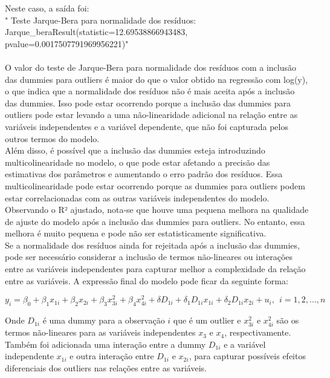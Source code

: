 \documentclass[a4paper, 12pt]{article}
\begin{document}
Neste caso, a saída foi:\\

" Teste Jarque-Bera para normalidade dos resíduos:\\ Jarque\_beraResult(statistic=12.69538866943483, pvalue=0.0017507791969956221)" \\ \\

O valor do teste de Jarque-Bera para normalidade dos resíduos com a inclusão das dummies para outliers é maior do que o valor obtido na regressão com log(y), o que indica que a normalidade dos resíduos não é mais aceita após a inclusão das dummies. Isso pode estar ocorrendo porque a inclusão das dummies para outliers pode estar levando a uma não-linearidade adicional na relação entre as variáveis independentes e a variável dependente, que não foi capturada pelos outros termos do modelo.\\

Além disso, é possível que a inclusão das dummies esteja introduzindo multicolinearidade no modelo, o que pode estar afetando a precisão das estimativas dos parâmetros e aumentando o erro padrão dos resíduos. Essa multicolinearidade pode estar ocorrendo porque as dummies para outliers podem estar correlacionadas com as outras variáveis independentes do modelo.\\

Observando o R² ajustado, nota-se que houve uma pequena melhora na qualidade de ajuste do modelo após a inclusão das dummies para outliers. No entanto, essa melhora é muito pequena e pode não ser estatisticamente significativa.\\

Se a normalidade dos resíduos ainda for rejeitada após a inclusão das dummies, pode ser necessário considerar a inclusão de termos não-lineares ou interações entre as variáveis independentes para capturar melhor a complexidade da relação entre as variáveis. A expressão final do modelo pode ficar da seguinte forma:

\begin{equation*}
y_i = \beta_0 + \beta_1 x_{1i} + \beta_2 x_{2i} + \beta_3 x_{3i}^2 + \beta_4 x_{4i}^2 + \delta D_{1i} + \delta_1 D_{1i} x_{1i} + \delta_2 D_{1i} x_{2i} + u_i, \>\ i = 1, 2, ..., n
\end{equation*}

Onde $D_{1i}$ é uma dummy para a observação $i$ que é um outlier e $x_{3i}^2$ e $x_{4i}^2$ são os termos não-lineares para as variáveis independentes $x_3$ e $x_4$, respectivamente. Também foi adicionada uma interação entre a dummy $D_{1i}$ e a variável independente $x_{1i}$ e outra interação entre $D_{1i}$ e $x_{2i}$, para capturar possíveis efeitos diferenciais dos outliers nas relações entre as variáveis.\\
\end{document}
